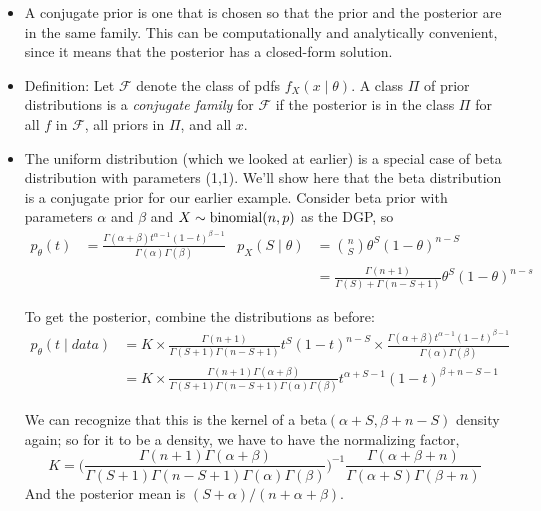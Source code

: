 \begin{itemize}

\item A conjugate prior is one that is chosen so that the prior and
  the posterior are in the same family.  This can be computationally
  and analytically convenient, since it means that the posterior has a
  closed-form solution.

\item Definition: \citep[From][7.2.3]{CB02} Let $\mathcal{F}$
  denote the class of pdfs $f_X(x \mid \theta)$.  A class $\Pi$ of prior
  distributions is a \emph{conjugate family} for $\mathcal F$ if the
  posterior is in the class $\Pi$ for all $f$ in $\mathcal F$, all
  priors in $\Pi$, and all $x$.

\item The uniform distribution (which we looked at earlier) is a
  special case of beta distribution with parameters (1,1).  We'll show
  here that the beta distribution is a conjugate prior for our earlier
  example.  Consider beta prior with parameters $\alpha$ and $\beta$ and $X \sim
  \operatorname{binomial}(n,p)$ as the DGP, so
  \begin{align*}
    p_\theta(t)      &= \frac{\Gamma(\alpha + \beta) t^{\alpha-1} (1-t)^{\beta-1}}{\Gamma(\alpha) \Gamma(\beta)}&
    p_{X}(S \mid \theta) &= \binom{n}{S} \theta^S (1-\theta)^{n-S} \\ 
    &&          &= \frac{\Gamma(n + 1)}{\Gamma(S) + \Gamma(n - S + 1)} \theta^S (1-\theta)^{n-s}
  \end{align*}
  
  To get the posterior, combine the distributions as before:
  \begin{align*}
    p_\theta(t \mid data)
    &= K \times \frac{\Gamma(n + 1)}{\Gamma(S + 1) \Gamma(n - S + 1)}
       t^S (1-t)^{n-S} \times \frac{\Gamma(\alpha + \beta) t^{\alpha-1} (1-t)^{\beta-1}}{\Gamma(\alpha) \Gamma(\beta)} \\
    &= K \times \frac{\Gamma(n + 1) \Gamma(\alpha + \beta)}{\Gamma(S + 1) \Gamma(n - S + 1) \Gamma(\alpha) \Gamma(\beta)}
       t^{\alpha + S - 1} (1 - t)^{\beta + n - S - 1}
  \end{align*}

  We can recognize that this is the kernel of a beta$(\alpha+S, \beta+n-S)$
  density again; so for it to be a density, we have to have the
  normalizing factor,
  \begin{equation*}
    K = \Big(\frac{\Gamma(n + 1) \Gamma(\alpha + \beta)}{\Gamma(S + 1) \Gamma(n - S +1)\Gamma(\alpha)\Gamma(\beta)}\Big)^{-1}
        \frac{\Gamma(\alpha + \beta + n)}{\Gamma(\alpha + S)\Gamma(\beta + n)}
  \end{equation*}
  And the posterior mean is $(S + \alpha) / (n + \alpha + \beta)$.


\end{itemize}
